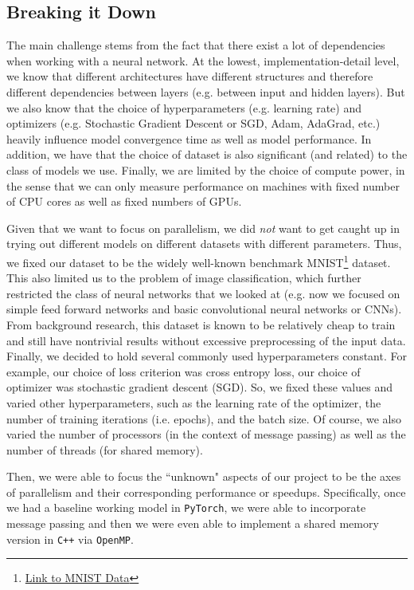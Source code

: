 \documentclass{article}
\begin{document}
\subsection{Breaking it Down}

The main challenge stems from the fact that there exist a lot of dependencies when working with a neural network. At the lowest, implementation-detail level, we know that different architectures have different structures and therefore different dependencies between layers (e.g. between input and hidden layers). But we also know that the choice of hyperparameters (e.g. learning rate) and optimizers (e.g. Stochastic Gradient Descent or SGD, Adam, AdaGrad, etc.) heavily influence model convergence time as well as model performance. In addition, we have that the choice of dataset is also significant (and related) to the class of models we use. Finally, we are limited by the choice of compute power, in the sense that we can only measure performance on machines with fixed number of CPU cores as well as fixed numbers of GPUs.

Given that we want to focus on parallelism, we did \textit{not} want to get caught up in trying out different models on different datasets with different parameters. Thus, we fixed our dataset to be the widely well-known benchmark MNIST\footnote{\href{http://yann.lecun.com/exdb/mnist/}{Link to MNIST Data}} dataset. This also limited us to the problem of image classification, which further restricted the class of neural networks that we looked at (e.g. now we focused on simple feed forward networks and basic convolutional neural networks or CNNs). From background research, this dataset is known to be relatively cheap to train and still have nontrivial results without excessive preprocessing of the input data. Finally, we decided to hold several commonly used hyperparameters constant. For example, our choice of loss criterion was cross entropy loss, our choice of optimizer was stochastic gradient descent (SGD). So, we fixed these values and varied other hyperparameters, such as the learning rate of the optimizer, the number of training iterations (i.e. epochs), and the batch size. Of course, we also varied the number of processors (in the context of message passing) as well as the number of threads (for shared memory).

Then, we were able to focus the ``unknown" aspects of our project to be the axes of parallelism and their corresponding performance or speedups. Specifically, once we had a baseline working model in \texttt{PyTorch}, we were able to incorporate message passing and then we were even able to implement a shared memory version in \texttt{C++} via \texttt{OpenMP}.
\end{document}
